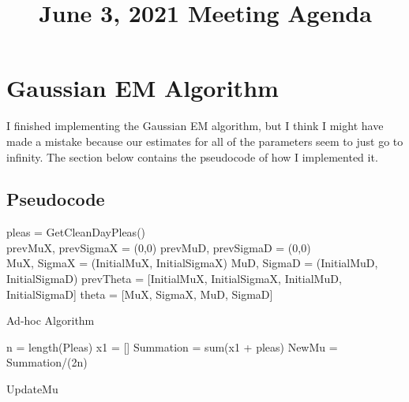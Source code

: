 \documentclass[11pt]{article}
\title{June 3, 2021 Meeting Agenda}
\begin{document}
\maketitle

\section{Gaussian EM Algorithm}
I finished implementing the Gaussian EM algorithm, but I think I might have made a mistake because our estimates for all of the parameters seem to just go to infinity. The section below contains the pseudocode of how I implemented it.


  \subsection{Pseudocode}
  \begin{algorithm}[H]
    \SetAlgoLined
    pleas = GetCleanDayPleas()\;\\

    prevMuX, prevSigmaX = (0,0)\;
    prevMuD, prevSigmaD = (0,0)\;\\

    MuX, SigmaX = (InitialMuX, InitialSigmaX)\;
    MuD, SigmaD = (InitialMuD, InitialSigmaD)\;
    prevTheta = [InitialMuX, InitialSigmaX, InitialMuD, InitialSigmaD]\;
    theta = [MuX, SigmaX, MuD, SigmaD]\;
    \caption{Ad-hoc Algorithm}
    \end{algorithm}

    \begin{algorithm}[H]
      \SetAlgoLined
      n = length(Pleas)\;
      x1 = []\;
      Summation = sum(x1 + pleas)\;
      NewMu = Summation/(2n)\;

      \caption{UpdateMu}
      \end{algorithm}
\end{document}
